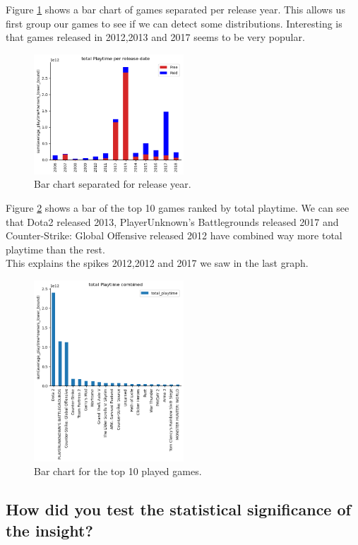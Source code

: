 \documentclass[11pt]{article}
\begin{document}
Figure \ref{fig:insight1_2} shows a bar chart of games separated per release year. This allows us first group our games to see if we can detect some distributions. Interesting is that games released in 2012,2013 and 2017 seems to be very popular. 
\begin{figure}
    \centering
    \includegraphics[width=0.5\textwidth]{graphics/insight1_graph2.png}
    \caption{Bar chart separated for release year.}
    \label{fig:insight1_2}
\end{figure}

Figure \ref{fig:insight1_3} shows a bar of the top 10 games ranked by total playtime. We can see that Dota2 released  2013, PlayerUnknown's Battlegrounds released 2017 and Counter-Strike: Global Offensive released 2012 have combined way more total playtime than the rest.\\
This explains the spikes 2012,2012 and 2017 we saw in the last graph.
\begin{figure}
    \centering
    \includegraphics[width=0.5\textwidth]{graphics/insight1_graph3.png}
    \caption{Bar chart for the top 10 played games.}
    \label{fig:insight1_3}
\end{figure}

\subsection{How did you test the statistical significance of the insight?}
\end{document}
